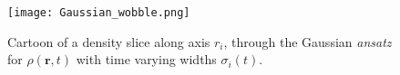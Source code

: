 \documentclass[reprint, amsmath, amssymb, aps, superscriptaddress]{revtex4-1}
\begin{document}
\begin{figure}[ht]
    \centering
        
        
        
    \texttt{[image: Gaussian\_wobble.png]}
    \caption{ Cartoon of a density slice  along axis $r_i$, through the Gaussian \textit{ansatz} for $\rho(\boldsymbol{r}, t)$ with time varying widths $\sigma_i(t)$. }
    \label{fig:nonequilibrium_ansatz}
\end{figure}
\end{document}
